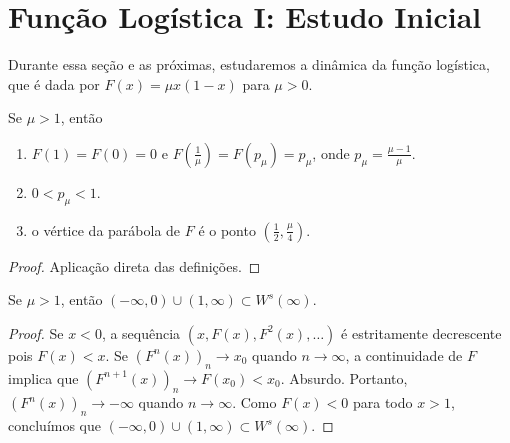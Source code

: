 \section{Função Logística I: Estudo Inicial}


Durante essa seção e as próximas, estudaremos a dinâmica da função logística, que é dada por $F(x) = \mu x(1-x)$ para $\mu > 0$.

\begin{proposition}
Se $\mu > 1$, então
\begin{enumerate}
\item $F (1) = F(0) = 0$ e $F(\frac{1}{\mu}) = F(p_\mu) = p_\mu$, onde $p_\mu = \frac{\mu - 1}{\mu}$.
\item $0 < p_\mu < 1$.
\item o vértice da parábola de $F$ é o ponto $(\frac{1}{2}, \frac{\mu}{4})$.
\end{enumerate}
\end{proposition}

\begin{proof}
Aplicação direta das definições.
\end{proof}

\begin{proposition}
\label{proposicao estudoinicial 1}
Se $\mu > 1$, então $(-\infty, 0) \cup (1, \infty) \subset W^s(\infty)$.
\end{proposition}

\begin{proof}
Se $x < 0$, a sequência  $(x, F(x), F^2(x), \dots)$ é estritamente decrescente pois  $F(x) < x$. Se $(F^n(x))_n \to x_0$ quando $n \to \infty$, a continuidade de $F$ implica que $(F^{n+1}(x))_n \to F (x_0) < x_0$. Absurdo. Portanto, $(F^n(x))_n \to -\infty$ quando $n \to \infty$. Como $F(x) < 0$ para todo $x > 1$, concluímos que $(-\infty, 0) \cup (1, \infty) \subset W^s(\infty)$.
\end{proof}


